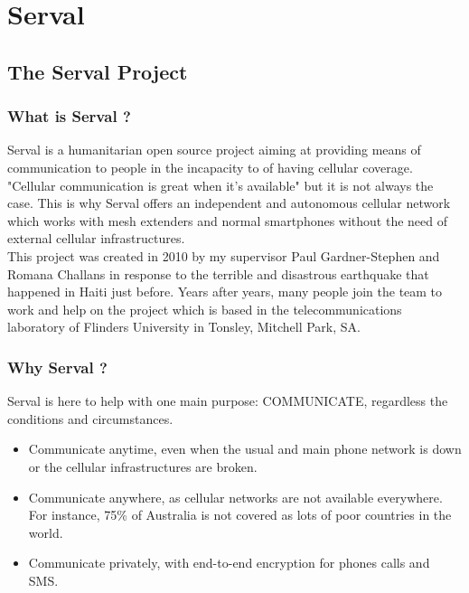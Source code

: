 \chapter{Serval}

\section{The Serval Project}

\subsection{What is Serval ?}
Serval is a humanitarian open source project aiming at providing means of communication to people in the incapacity to of having cellular coverage. "Cellular communication is great when it's available" but it is not always the case. This is why Serval offers an independent and autonomous cellular network which works with mesh extenders and normal smartphones without the need of external cellular infrastructures. \\
This project was created in 2010 by my supervisor Paul Gardner-Stephen and Romana Challans in response to the terrible and disastrous earthquake that happened in Haiti just before. Years after years, many people join the team to work and help on the project which is based in the telecommunications laboratory of Flinders University in Tonsley, Mitchell Park, SA. 


\subsection{Why Serval ?}
Serval is here to help with one main purpose: COMMUNICATE, regardless the conditions and circumstances.
\begin{itemize}
\item Communicate anytime, even when the usual and main phone network is down or the cellular infrastructures are broken.
\item Communicate anywhere, as cellular networks are not available everywhere. For instance, 75\% of Australia is not covered as lots of poor countries in the world. 
\item Communicate privately, with end-to-end encryption for phones calls and SMS.
\end{itemize}

